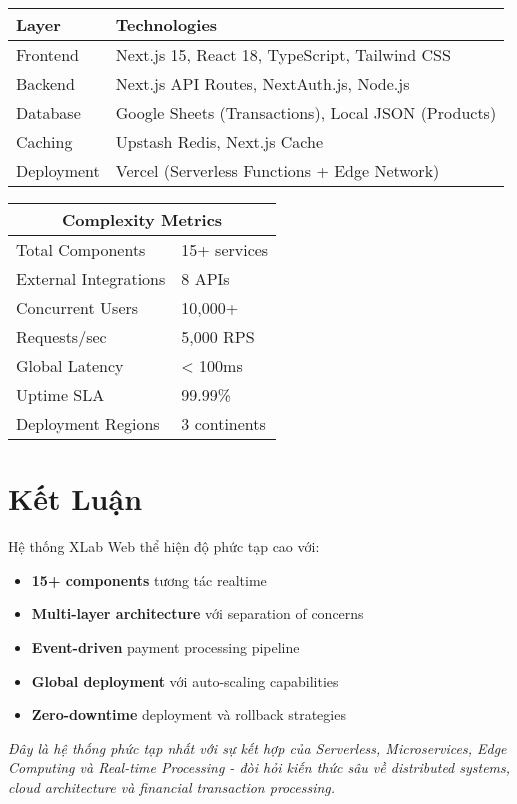 \documentclass[12pt,a4paper]{article}
\begin{document}
\begin{center}
\begin{tabular}{|l|l|}
\hline
\textbf{Layer} & \textbf{Technologies} \\
\hline
Frontend & Next.js 15, React 18, TypeScript, Tailwind CSS \\
\hline
Backend & Next.js API Routes, NextAuth.js, Node.js \\
\hline
Database & Google Sheets (Transactions), Local JSON (Products) \\
\hline
Caching & Upstash Redis, Next.js Cache \\
\hline
Deployment & Vercel (Serverless Functions + Edge Network) \\
\hline
\end{tabular}
\end{center}

\vspace{5mm}

\begin{center}
\begin{tabular}{|l|l|}
\hline
\multicolumn{2}{|c|}{\textbf{Complexity Metrics}} \\
\hline
Total Components & 15+ services \\
\hline
External Integrations & 8 APIs \\
\hline
Concurrent Users & 10,000+ \\
\hline
Requests/sec & 5,000 RPS \\
\hline
Global Latency & < 100ms \\
\hline
Uptime SLA & 99.99\% \\
\hline
Deployment Regions & 3 continents \\
\hline
\end{tabular}
\end{center}

\section{Kết Luận}

Hệ thống XLab Web thể hiện độ phức tạp cao với:
\begin{itemize}[leftmargin=*]
    \item \textbf{15+ components} tương tác realtime
    \item \textbf{Multi-layer architecture} với separation of concerns
    \item \textbf{Event-driven} payment processing pipeline
    \item \textbf{Global deployment} với auto-scaling capabilities
    \item \textbf{Zero-downtime} deployment và rollback strategies
\end{itemize}

\vspace{3mm}
\noindent
\textit{Đây là hệ thống phức tạp nhất với sự kết hợp của Serverless, Microservices, Edge Computing và Real-time Processing - đòi hỏi kiến thức sâu về distributed systems, cloud architecture và financial transaction processing.}
\end{document}
